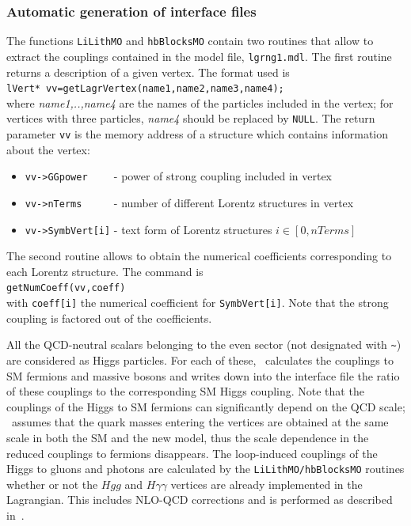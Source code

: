 \documentclass[12pt,a4paper]{article}
\begin{document}
\subsubsection{Automatic generation of interface files}
\label{sec:auto}

The functions {\tt LiLithMO} and {\tt hbBlocksMO} contain two routines  that allow  to extract the couplings contained in the model file, {\tt lgrng1.mdl}.    
The first routine returns a description of a given vertex. The format used is \\

\verb|lVert* vv=getLagrVertex(name1,name2,name3,name4);|\\

\noindent
where {\it name1,..,name4 } are the names of the particles included  in the vertex; for vertices with three particles, {\it name4} should be replaced by
{\tt NULL}.  The return parameter {\tt vv} is the memory address of a structure which contains information about the vertex:
\begin{itemize}
\item \verb|vv->GGpower    | - power of strong coupling included in vertex
\item \verb|vv->nTerms     | - number of different  Lorentz structures in vertex
\item \verb|vv->SymbVert[i]| - text form of Lorentz structures $i\in [0,nTerms]$  
\end{itemize}
The second routine allows to obtain the numerical coefficients corresponding to  each  Lorentz structure. The command is\\

\verb|getNumCoeff(vv,coeff)| \\

\noindent
with {\tt coeff[i]} the numerical coefficient for {\tt SymbVert[i]}. Note that the strong coupling is factored out of the coefficients. 

 
All the QCD-neutral scalars belonging to the even sector (not designated with \verb|~|)  are considered as  Higgs particles. For each of these, \micro\ calculates  the couplings to  SM fermions and massive  bosons and  writes down into the interface file the ratio of these couplings to the  corresponding  SM Higgs coupling. Note that the  couplings of the Higgs to   SM  fermions can significantly depend on the QCD scale; \micro\ assumes that the quark masses entering the vertices are obtained at the same scale in both  the
SM and  the new model, thus the scale dependence in the  reduced couplings to fermions disappears. 
The loop-induced  couplings of the Higgs to  gluons and photons are calculated by the {\tt LiLithMO/hbBlocksMO}  routines whether or not the $Hgg$ and $H\gamma\gamma$ vertices are already implemented in the Lagrangian. This includes NLO-QCD corrections and is performed as described in~\cite{Belanger:2013oya,Djouadi:1997yw}.
\end{document}
